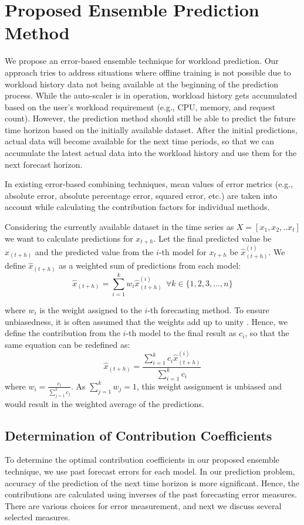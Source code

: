 \section{Proposed Ensemble Prediction Method}

We propose an error-based ensemble technique for workload prediction. Our approach tries to address situations where offline training is not possible due to workload history data not being available at the beginning of the prediction process. While the auto-scaler is in operation, workload history gets accumulated based on the user's workload requirement (e.g., CPU, memory, and request count). However, the prediction method should still be able to predict the future time horizon based on the initially available dataset. After the initial predictions, actual data will become available for the next time periods, so that we can accumulate the latest actual data into the workload history and use them for the next forecast horizon.

In existing error-based combining techniques, mean values of error metrics (e.g., absolute error, absolute percentage error, squared error, etc.) are taken into account while calculating the contribution factors for individual methods. 

Considering the currently available dataset in the time series as
$X=[x_{1},x_{2},.. x_{t}]$
we want to calculate predictions for $x_{t+h}$. Let the final predicted value be $\hat{x}_{(t+h)}$ and the predicted value from the $i$-th model for $x_{t+h}$ be $\hat{x}_{(t+h)}^{(i)}$. We define $\hat{x}_{(t+h)}$ as a weighted sum of predictions from each model:
$$\hat{x}_{(t+h)}= \sum_{i=1}^{k}w_i \hat{x}_{(t+h)}^{(i)} \ \ \forall k \in \{1,2,3,...,n\}$$

where $w_i$ is the weight assigned to the $i$-th forecasting method. To ensure unbiasedness, it is often assumed that the weights add up to unity \cite{Adhikari_2012}. Hence, we define the contribution from the $i$-th model to the final result as $c_i$, so that the same equation can be redefined as:
$$\hat{x}_{(t+h)}= \frac{\sum_{i=1}^{k}c_i \hat{x}_{(t+h)}^{(i)}}{\sum_{i=1}^{k}c_i}$$ 
where $w_{i}= \frac{c_{i}}{\sum_{j=1}^{k}c_j}$. As $\sum_{j=1}^{k}w_{j}=1$, this weight assignment is unbiased and would result in the weighted average of the predictions.

\subsection{Determination of Contribution Coefficients}
To determine the optimal contribution coefficients in our proposed ensemble technique, we use past forecast errors for each model. In our prediction problem, accuracy of the prediction of the next time horizon is more significant. Hence, the contributions are calculated using inverses of the past forecasting error measures. There are various choices for error measurement, and next we discuss several selected measures.

